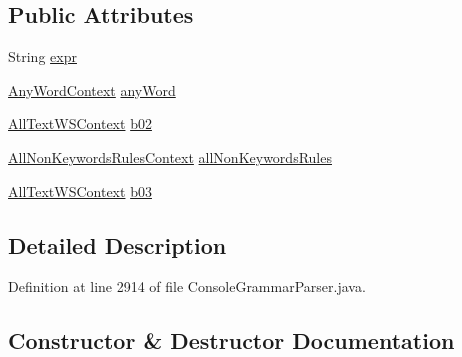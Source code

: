 \subsection*{Public Attributes}
\begin{DoxyCompactItemize}
\item 
String \hyperlink{classgov_1_1nasa_1_1jpf_1_1inspector_1_1client_1_1parser_1_1_console_grammar_parser_1_1_all_text_context_ac0e464b9e367b00886e8c46acde196fd}{expr}
\item 
\hyperlink{classgov_1_1nasa_1_1jpf_1_1inspector_1_1client_1_1parser_1_1_console_grammar_parser_1_1_any_word_context}{Any\+Word\+Context} \hyperlink{classgov_1_1nasa_1_1jpf_1_1inspector_1_1client_1_1parser_1_1_console_grammar_parser_1_1_all_text_context_ac640d589c0a794c2542e07c897aa9508}{any\+Word}
\item 
\hyperlink{classgov_1_1nasa_1_1jpf_1_1inspector_1_1client_1_1parser_1_1_console_grammar_parser_1_1_all_text_w_s_context}{All\+Text\+W\+S\+Context} \hyperlink{classgov_1_1nasa_1_1jpf_1_1inspector_1_1client_1_1parser_1_1_console_grammar_parser_1_1_all_text_context_a0262ae5fe719cd2becee678a2d514e38}{b02}
\item 
\hyperlink{classgov_1_1nasa_1_1jpf_1_1inspector_1_1client_1_1parser_1_1_console_grammar_parser_1_1_all_non_keywords_rules_context}{All\+Non\+Keywords\+Rules\+Context} \hyperlink{classgov_1_1nasa_1_1jpf_1_1inspector_1_1client_1_1parser_1_1_console_grammar_parser_1_1_all_text_context_a8c34c52b03c69034c597754a56f13b7e}{all\+Non\+Keywords\+Rules}
\item 
\hyperlink{classgov_1_1nasa_1_1jpf_1_1inspector_1_1client_1_1parser_1_1_console_grammar_parser_1_1_all_text_w_s_context}{All\+Text\+W\+S\+Context} \hyperlink{classgov_1_1nasa_1_1jpf_1_1inspector_1_1client_1_1parser_1_1_console_grammar_parser_1_1_all_text_context_a444193836ae82cfc33eb0b0a4dbd3537}{b03}
\end{DoxyCompactItemize}


\subsection{Detailed Description}


Definition at line 2914 of file Console\+Grammar\+Parser.\+java.



\subsection{Constructor \& Destructor Documentation}
